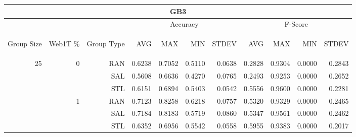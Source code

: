\begin{center}
\begin{table}[htbp] 
 \begin{center}
\begin{tabular}{ | r | r | r | r | r | r | r | r | r | r | r |}
\hline
\multicolumn{11}{|c|}{GB3}\\
\hline
 & & & \multicolumn{4}{|c|}{Accuracy} & \multicolumn{4}{|c|}{F-Score}\\ \cline{4-11}
\begin{sideways}Group Size\end{sideways} & \begin{sideways}Web1T \%\end{sideways} & \begin{sideways}Group Type\end{sideways} & \begin{sideways}AVG\end{sideways} & \begin{sideways}MAX\end{sideways} & \begin{sideways}MIN\end{sideways} & \begin{sideways}STDEV\end{sideways} & \begin{sideways}AVG\end{sideways} & \begin{sideways}MAX\end{sideways} & \begin{sideways}MIN\end{sideways} & \begin{sideways}STDEV\end{sideways}\\
\hline
\multirow{18}{*}{25}
 & \multirow{3}{*}{0} & RAN & 0.6238 & 0.7052 & 0.5110 & 0.0638 & 0.2828 & 0.9304 & 0.0000 & 0.2843\\ \cline{3-11}
 &   & SAL & 0.5608 & 0.6636 & 0.4270 & 0.0765 & 0.2493 & 0.9253 & 0.0000 & 0.2652\\ \cline{3-11}
 &   & STL & 0.6151 & 0.6894 & 0.5403 & 0.0542 & 0.5556 & 0.9600 & 0.0000 & 0.2281\\ \cline{2-11}
 & \multirow{3}{*}{1} & RAN & 0.7123 & 0.8258 & 0.6218 & 0.0757 & 0.5320 & 0.9329 & 0.0000 & 0.2465\\ \cline{3-11}
 &   & SAL & 0.7184 & 0.8183 & 0.5719 & 0.0860 & 0.5347 & 0.9561 & 0.0000 & 0.2462\\ \cline{3-11}
 &   & STL & 0.6352 & 0.6956 & 0.5542 & 0.0558 & 0.5955 & 0.9383 & 0.0000 & 0.2017\\ \cline{2-11}

\end{tabular}
\end{center}
\end{table}
\end{center}
